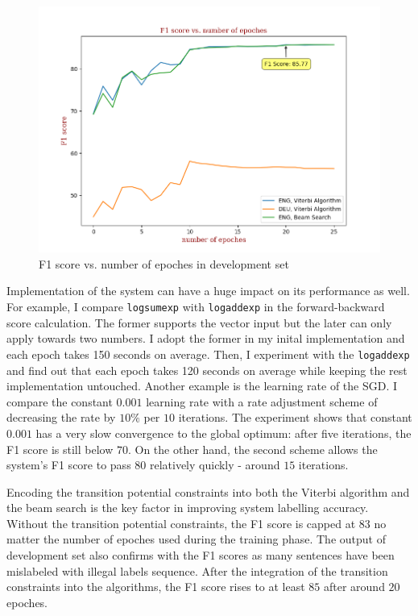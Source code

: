 \documentclass[11pt,a4paper]{article}
\begin{document}
\begin{figure}[bhp]
\includegraphics[width=\columnwidth]{F1.png}
\caption{F1 score vs. number of epoches in development set}
\end{figure}

Implementation of the system can have a huge impact on its performance as well. 
For example, I compare \verb|logsumexp| \cite{scipy} with \verb|logaddexp| \cite{scipy}
in the forward-backward score calculation. The former supports the vector input but the later
can only apply towards two numbers. I adopt the former in my inital implementation and
each epoch takes 150 seconds on average. Then, I experiment with the \verb|logaddexp| and find out
that each epoch takes 120 seconds on average while keeping the rest implementation untouched.
Another example is the learning rate of the SGD. I compare the constant $0.001$ learning rate
with a rate adjustment scheme of decreasing the rate by $10\%$ per $10$ iterations. 
The experiment shows that constant $0.001$ has a very slow convergence
to the global optimum: after five iterations, the F1 score is still below $70$. On the other hand,
the second scheme allows the system's F1 score to pass $80$ relatively quickly 
- around $15$ iterations. 

Encoding the transition potential constraints into both the Viterbi algorithm and
the beam search is the key factor in improving system labelling accuracy.
Without the transition potential constraints, the 
F1 score is capped at $83$ no matter the number of epoches used during the training phase.
The output of development set also confirms with the F1 scores as many sentences have 
been mislabeled with illegal labels sequence. After the integration of
the transition constraints into the algorithms, the F1 score rises to at least $85$ after around
$20$ epoches.
\end{document}
